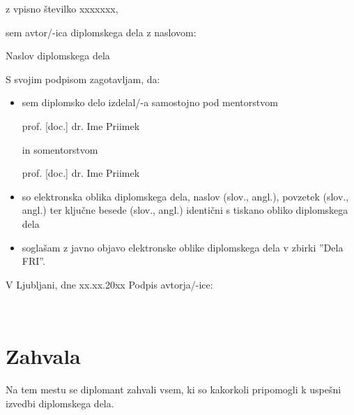 \documentclass[12pt,a4paper,openany]{book}
\begin{document}
\vspace{0.5cm}
z vpisno številko \hspace{0.5cm} xxxxxxx,

\vspace{1cm}
sem avtor/-ica diplomskega dela z naslovom:
   
\vspace{0.5cm}
Naslov diplomskega dela

\vspace{1.5cm}
S svojim podpisom zagotavljam, da:
\begin{itemize}
	\item sem diplomsko delo izdelal/-a samostojno pod mentorstvom 
	
	prof. [doc.] dr. Ime Priimek
	
	in somentorstvom 
	
	prof. [doc.] dr. Ime Priimek
	
	\item	so elektronska oblika diplomskega dela, naslov (slov., angl.), povzetek (slov., angl.) ter ključne besede (slov., 			angl.) identični s tiskano obliko diplomskega dela
	\item soglašam z javno objavo elektronske oblike diplomskega dela v zbirki ''Dela FRI''.
\end{itemize}

\vspace{1cm}
V Ljubljani, dne xx.xx.20xx \hspace{1cm} Podpis avtorja/-ice:

\newpage 


\ \thispagestyle{empty}

\newpage



\chapter*{Zahvala}

\thispagestyle{empty}

Na tem mestu se diplomant zahvali vsem, ki so kakorkoli pripomogli k uspešni izvedbi diplomskega dela.


\newpage

\end{document}
